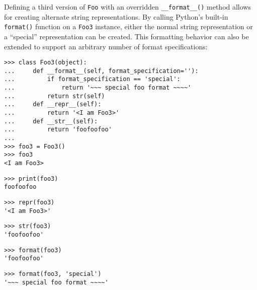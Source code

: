 \noindent Defining a third version of \texttt{Foo} with an overridden
\texttt{\_\_format\_\_()} method allows for creating alternate string
representations. By calling Python's built-in \texttt{format()} function on a
\texttt{Foo3} instance, either the normal string representation or a
\enquote{special} representation can be created. This formatting behavior can
also be extended to support an arbitrary number of format specifications:

\begin{comment}
<abjad>
class Foo3(object):
    def __format__(self, format_specification=''):
        if format_specification == 'special':
            return '~~~ special foo format ~~~~'
        return str(self)
    def __repr__(self):
        return '<I am Foo3>'
    def __str__(self):
        return 'foofoofoo'

foo3 = Foo3()
foo3
print(foo3)
repr(foo3)
str(foo3)
format(foo3)
format(foo3, 'special')
</abjad>
\end{comment}

\begin{abjadbookoutput}
\begin{singlespacing}
\vspace{-0.5\baselineskip}
\begin{lstlisting}
>>> class Foo3(object):
...     def __format__(self, format_specification=''):
...         if format_specification == 'special':
...             return '~~~ special foo format ~~~~'
...         return str(self)
...     def __repr__(self):
...         return '<I am Foo3>'
...     def __str__(self):
...         return 'foofoofoo'
...
>>> foo3 = Foo3()
>>> foo3
<I am Foo3>
\end{lstlisting}
\begin{lstlisting}
>>> print(foo3)
foofoofoo
\end{lstlisting}
\begin{lstlisting}
>>> repr(foo3)
'<I am Foo3>'
\end{lstlisting}
\begin{lstlisting}
>>> str(foo3)
'foofoofoo'
\end{lstlisting}
\begin{lstlisting}
>>> format(foo3)
'foofoofoo'
\end{lstlisting}
\begin{lstlisting}
>>> format(foo3, 'special')
'~~~ special foo format ~~~~'
\end{lstlisting}
\end{singlespacing}
\end{abjadbookoutput}


